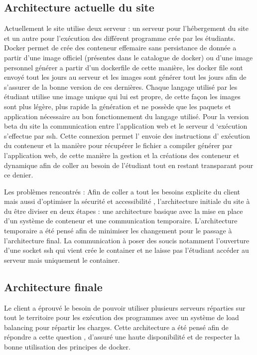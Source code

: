 \subsection{Architecture actuelle du site}

\par Actuellement le site utilise deux serveur : un serveur pour l’hébergement du site et un autre pour l’exécution des différent programme crée par les étudiants. Docker permet de crée des conteneur effemaire sans persistance de donnée a partir d’une image officiel (présentes dans le catalogue de docker) ou d’une image personnel générer a partir d’un dockerfile de cette manière, les docker file sont envoyé tout les jours au serveur et les images sont générer tout les jours afin de s’assurer de la bonne version de ces dernières. Chaque langage utilisé par les étudiant utilise une image unique qui lui est propre, de cette façon les images sont plus légère, plus rapide la génération et ne possède que les paquets et application nécessaire au bon fonctionnement du langage utilisé. Pour la version beta du site la communication entre l’application web et le serveur d ‘exécution s’effectue par ssh. Cette connexion permet l’ envoie des instructions  d’ exécution du conteneur et la manière pour récupérer le fichier a compiler générer par l’application web, de cette manière la gestion et la créations des conteneur et dynamique afin de coller au besoin de l’étudiant tout en restant transparant pour ce denier. 

\par Les problèmes rencontrés : Afin de coller a tout les besoins explicite du client mais aussi d’optimiser  la sécurité et accessibilité , l’architecture initiale du site à du être diviser en deux étapes : une architecture basique avec la mise en place d’un système de conteneur et une communication temporaire. L’architecture temporaire a été pensé afin de minimiser les changement pour le passage à l’architecture final. La communication à poser des soucis notamment l’ouverture d’une socket ssh qui vient crée le container et ne laisse pas l’étudiant accéder au serveur mais uniquement le container.

\subsection{Architecture finale}

\par Le client a éprouvé le besoin de pouvoir utiliser plusieurs serveurs réparties sur tout le territoire pour les exécution des programmes avec un système de load balancing pour répartir les charges.
Cette architecture a été pensé afin de répondre a cette question , d’assuré une haute disponibilité et de respecter la bonne utilisation des principes de docker.

